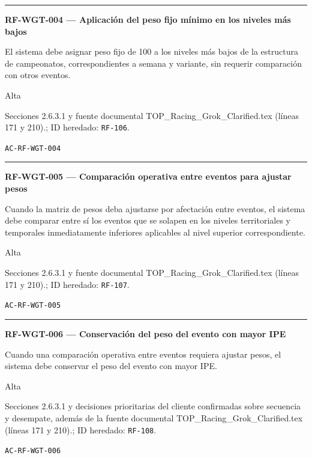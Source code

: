 \documentclass[10pt,letterpaper]{article}
\begin{document}
\vspace{0.25em}\hrule\vspace{0.65em}
\noindent\textbf{RF-WGT-004 --- Aplicación del peso fijo mínimo en los niveles más bajos}\par
\begin{description}[style=nextline,leftmargin=3.15cm,labelwidth=2.8cm,font=\normalfont\bfseries]
\item[Obligación] El sistema debe asignar peso fijo de 100 a los niveles más bajos de la estructura de campeonatos, correspondientes a semana y variante, sin requerir comparación con otros eventos.
\item[Prioridad] Alta
\item[Procedencia] Secciones 2.6.3.1 y fuente documental TOP\_Racing\_Grok\_Clarified.tex (líneas 171 y 210).; ID heredado: \texttt{RF-106}.
\item[Verificación] \texttt{AC-RF-WGT-004}
\end{description}
\vspace{0.25em}\hrule\vspace{0.65em}
\noindent\textbf{RF-WGT-005 --- Comparación operativa entre eventos para ajustar pesos}\par
\begin{description}[style=nextline,leftmargin=3.15cm,labelwidth=2.8cm,font=\normalfont\bfseries]
\item[Obligación] Cuando la matriz de pesos deba ajustarse por afectación entre eventos, el sistema debe comparar entre sí los eventos que se solapen en los niveles territoriales y temporales inmediatamente inferiores aplicables al nivel superior correspondiente.
\item[Prioridad] Alta
\item[Procedencia] Secciones 2.6.3.1 y fuente documental TOP\_Racing\_Grok\_Clarified.tex (líneas 171 y 210).; ID heredado: \texttt{RF-107}.
\item[Verificación] \texttt{AC-RF-WGT-005}
\end{description}
\vspace{0.25em}\hrule\vspace{0.65em}
\noindent\textbf{RF-WGT-006 --- Conservación del peso del evento con mayor IPE}\par
\begin{description}[style=nextline,leftmargin=3.15cm,labelwidth=2.8cm,font=\normalfont\bfseries]
\item[Obligación] Cuando una comparación operativa entre eventos requiera ajustar pesos, el sistema debe conservar el peso del evento con mayor IPE.
\item[Prioridad] Alta
\item[Procedencia] Secciones 2.6.3.1 y decisiones prioritarias del cliente confirmadas sobre secuencia y desempate, además de la fuente documental TOP\_Racing\_Grok\_Clarified.tex (líneas 171 y 210).; ID heredado: \texttt{RF-108}.
\item[Verificación] \texttt{AC-RF-WGT-006}
\end{description}
\end{document}
